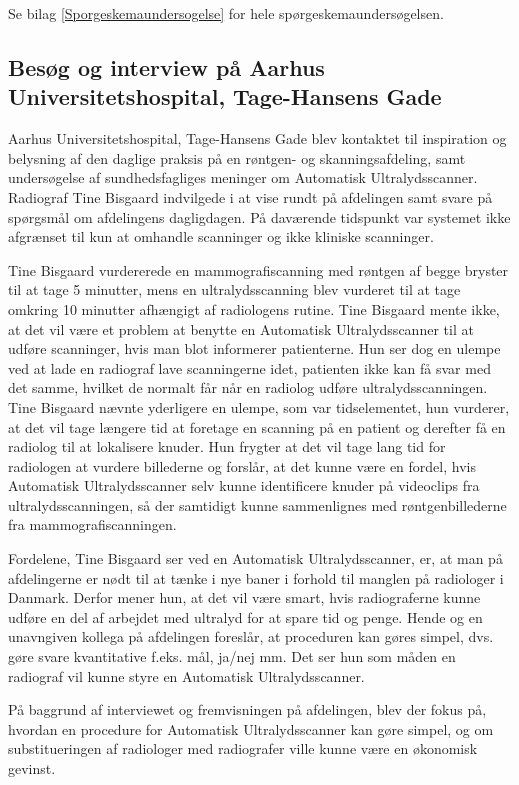 Se bilag \ref{Sporgeskemaundersogelse} for hele spørgeskemaundersøgelsen. 

\subsection{Besøg og interview på Aarhus Universitetshospital, Tage-Hansens Gade} 
Aarhus Universitetshospital, Tage-Hansens Gade blev kontaktet til inspiration og belysning af den daglige praksis på en røntgen- og skanningsafdeling, samt undersøgelse af sundhedsfagliges meninger om Automatisk Ultralydsscanner. Radiograf Tine Bisgaard indvilgede i at vise rundt på afdelingen samt svare på spørgsmål om afdelingens dagligdagen. På daværende tidspunkt var systemet ikke afgrænset til kun at omhandle scanninger og ikke kliniske scanninger. 

Tine Bisgaard vurdererede en mammografiscanning med røntgen af begge bryster til at tage 5 minutter, mens en ultralydsscanning blev vurderet til at tage omkring 10 minutter afhængigt af radiologens rutine. Tine Bisgaard mente ikke, at det vil være et problem at benytte en Automatisk Ultralydsscanner til at udføre scanninger, hvis man blot informerer patienterne. Hun ser dog en ulempe ved at lade en radiograf lave scanningerne idet, patienten ikke kan få svar med det samme, hvilket de normalt får når en radiolog udføre ultralydsscanningen. Tine Bisgaard nævnte yderligere en ulempe, som var tidselementet, hun vurderer, at det vil tage længere tid at foretage en scanning på en patient og derefter få en radiolog til at lokalisere knuder. Hun frygter at det vil tage lang tid for radiologen at vurdere billederne og forslår, at det kunne være en fordel, hvis Automatisk Ultralydsscanner selv kunne identificere knuder på videoclips fra ultralydsscanningen, så der samtidigt kunne sammenlignes med røntgenbillederne fra mammografiscanningen. 

Fordelene, Tine Bisgaard ser ved en Automatisk Ultralydsscanner, er, at man på afdelingerne er nødt til at tænke i nye baner i forhold til manglen på radiologer i Danmark. Derfor mener hun, at det vil være smart, hvis radiograferne kunne udføre en del af arbejdet med ultralyd for at spare tid og penge. Hende og en unavngiven kollega på afdelingen foreslår, at proceduren kan gøres simpel, dvs. gøre svare kvantitative f.eks. mål, ja/nej mm. Det ser hun som måden en radiograf vil kunne styre en Automatisk Ultralydsscanner.

På baggrund af interviewet og fremvisningen på afdelingen, blev der fokus på, hvordan en procedure for Automatisk Ultralydsscanner kan gøre simpel, og om substitueringen af radiologer med radiografer ville kunne være en økonomisk gevinst. 

